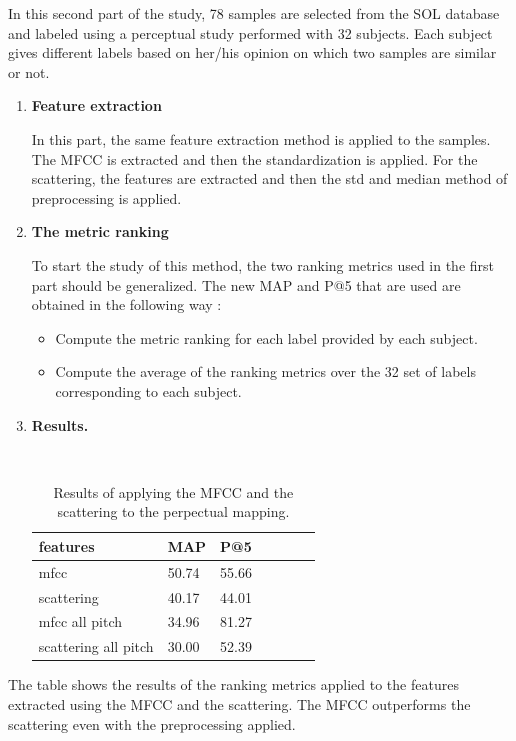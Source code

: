 \documentclass[hidelinks,12pt]{report}
\begin{document}
In this second part of the study, 78 samples are selected from the SOL database and labeled using a perceptual study performed with 32 subjects. Each subject gives different labels based on her/his opinion on which two samples are similar or not. \par
\begin{enumerate}
\item \textbf{Feature extraction} \par
In this part, the same feature extraction method is applied to the samples. The MFCC is extracted and then the standardization is applied. For the scattering, the features are extracted and then the std and median method of preprocessing is applied.




\item \textbf{The metric ranking} \par
To start the study of this method, the two ranking metrics used in the first part should be generalized. The new MAP and P@5 that are used are obtained in the following way :
 \begin{itemize}
\item Compute the metric ranking for each label provided by each subject.
\item Compute the average of the ranking metrics over the 32 set of labels corresponding to each subject.
\end{itemize}

\item \textbf{Results.}

\begin{table}[H]
\begin{center} 
\ 
 \setlength{\tabcolsep}{.16667em} 
\begin{tabular}{ | l | l | l | l | l | l | l |} 
\hline
features & MAP & P@5 \\ 
\hline 
mfcc &  50.74  & 55.66 \\ 
scattering & 40.17 & 44.01  \\ 
mfcc all pitch & 34.96 & 81.27 \\
scattering all pitch & 30.00 & 52.39\\
\hline
\end{tabular} 
\end{center} 
\caption{Results of applying the MFCC and the scattering to the perpectual mapping.} 
\label{ground truth} 
\end{table}
\end{enumerate}

The table shows the results of the ranking metrics applied to the features extracted using the MFCC and the scattering. The MFCC outperforms the scattering even with the preprocessing applied.
\end{document}
